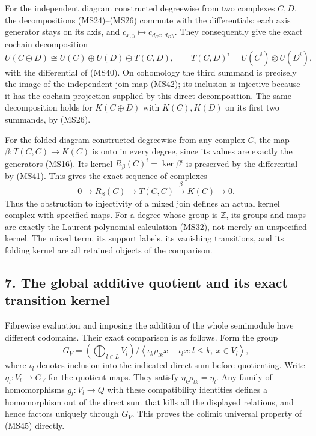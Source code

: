 \documentclass[
]{article}
\begin{document}
For the independent diagram constructed degreewise from two complexes
\(C,D\), the decompositions (MS24)--(MS26) commute with the
differentials: each axis generator stays on its axis, and
\(c_{x,y}\mapsto c_{d_Cx,d_Dy}\). They consequently give the exact
cochain decomposition \[
U(C\oplus D)
\cong U(C)\oplus U(D)\oplus T(C,D),
\qquad T(C,D)^i=U(C^i)\otimes U(D^i),
\tag{MS43}
\] with the differential of (MS40). On cohomology the third summand is
precisely the image of the independent-join map (MS42); its inclusion is
injective because it has the cochain projection supplied by this direct
decomposition. The same decomposition holds for \(K(C\oplus D)\) with
\(K(C),K(D)\) on its first two summands, by (MS26).

For the folded diagram constructed degreewise from any complex \(C\),
the map \(\beta:T(C,C)\to K(C)\) is onto in every degree, since its
values are exactly the generators (MS16). Its kernel
\(R_\beta(C)^i=\ker\beta^i\) is preserved by the differential by (MS41).
This gives the exact sequence of complexes \[
0\longrightarrow R_\beta(C)
\longrightarrow T(C,C)
\xrightarrow{\ \beta\ }K(C)
\longrightarrow0.
\tag{MS44}
\] Thus the obstruction to injectivity of a mixed join defines an actual
kernel complex with specified maps. For a degree whose group is
\(\mathbb Z\), its groups and maps are exactly the Laurent-polynomial
calculation (MS32), not merely an unspecified kernel. The mixed term,
its support labels, its vanishing transitions, and its folding kernel
are all retained objects of the comparison.

\subsection{7. The global additive quotient and its exact transition
kernel}\label{the-global-additive-quotient-and-its-exact-transition-kernel}

Fibrewise evaluation and imposing the addition of the whole semimodule
have different codomains. Their exact comparison is as follows. Form the
group \[
G_V=\left(\bigoplus_{l\in L}V_l\right)
\Big/
\left\langle\iota_k\rho_{lk}x-\iota_lx:
l\le k,\ x\in V_l\right\rangle,
\tag{MS45}
\] where \(\iota_l\) denotes inclusion into the indicated direct sum
before quotienting. Write \(\eta_l:V_l\to G_V\) for the quotient maps.
They satisfy \(\eta_k\rho_{lk}=\eta_l\). Any family of homomorphisms
\(g_l:V_l\to Q\) with these compatibility identities defines a
homomorphism out of the direct sum that kills all the displayed
relations, and hence factors uniquely through \(G_V\). This proves the
colimit universal property of (MS45) directly.
\end{document}
